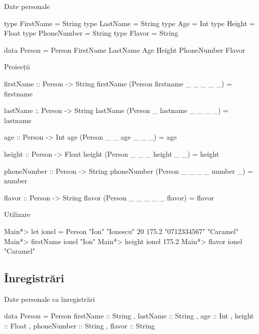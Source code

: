 \documentclass[handout,xcolor=pdftex,romanian,colorlinks]{beamer}
\begin{document}
\begin{frame}[fragile]{Date personale}
\begin{asciihs}
type FirstName  = String  
type LastName   = String  
type Age        = Int  
type Height     = Float  
type PhoneNumber = String  
type Flavor      = String  
                     
data Person = Person FirstName LastName Age Height
    PhoneNumber Flavor


\end{asciihs}

\end{frame}

\begin{frame}[fragile]{Proiecții}
\begin{asciihs}
    firstName :: Person -> String  
    firstName (Person firstname _ _ _ _ _) = firstname  
      
    lastName :: Person -> String  
    lastName (Person _ lastname _ _ _ _) = lastname  
      
    age :: Person -> Int  
    age (Person _ _ age _ _ _) = age  
      
    height :: Person -> Float  
    height (Person _ _ _ height _ _) = height  
      
    phoneNumber :: Person -> String  
    phoneNumber (Person _ _ _ _ number _) = number  
      
    flavor :: Person -> String  
    flavor (Person _ _ _ _ _ flavor) = flavor  
\end{asciihs}
\end{frame}

\begin{frame}[fragile]{Utilizare}
\begin{asciihs}
Main*> let ionel = Person "Ion" "Ionescu" 20 175.2 
    "0712334567" "Caramel"
Main*> firstName ionel
"Ion"  
Main*> height ionel
175.2  
Main*> flavor ionel  
"Caramel"  
\end{asciihs}
\end{frame}

\subsection{Înregistrări}

\begin{frame}[fragile]{Date personale ca înregistrări}
\begin{asciihs}
data Person = Person { firstName :: String  
                     , lastName :: String  
                     , age :: Int  
                     , height :: Float  
                     , phoneNumber :: String  
                     , flavor :: String  
                     }
\end{asciihs}
\end{frame}
\end{document}
